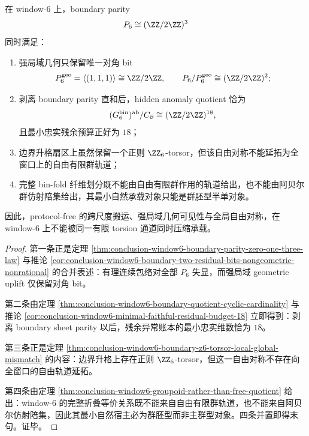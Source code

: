 \begin{theorem}\label{thm:conclusion-window6-boundary-onebit-eighteenquotient-groupoid-splitting}
在 window-\(6\) 上，boundary parity
\[
P_6\cong (\ZZ/2\ZZ)^3
\]
同时满足：
\begin{enumerate}
  \item 强局域几何只保留唯一对角 bit
  \[
  P_6^{\mathrm{geo}}=\langle(1,1,1)\rangle\cong \ZZ/2\ZZ,
  \qquad
  P_6/P_6^{\mathrm{geo}}\cong (\ZZ/2\ZZ)^2;
  \]
  \item 剥离 boundary parity 直和后，hidden anomaly quotient 恰为
  \[
  (G_6^{\mathrm{bin}})^{\mathrm{ab}}/C_{\partial}\cong (\ZZ/2\ZZ)^{18},
  \]
  且最小忠实残余预算正好为 \(18\)；
  \item 边界升格扇区上虽然保留一个正则 \(\ZZ_6\)-torsor，但该自由对称不能延拓为全窗口上的自由有限群轨道；
  \item 完整 bin-fold 纤维划分既不能由自由有限群作用的轨道给出，也不能由阿贝尔群仿射陪集给出，其最小自然承载对象只能是群胚型半单对象。
\end{enumerate}
因此，protocol-free 的跨尺度搬运、强局域几何可见性与全局自由对称，在 window-\(6\) 上不能被同一有限 torsion 通道同时压缩承载。
\end{theorem}
\begin{proof}
第一条正是定理 \ref{thm:conclusion-window6-boundary-parity-zero-one-three-law} 与推论 \ref{cor:conclusion-window6-boundary-two-residual-bits-nongeometric-nonrational} 的合并表述：有理连续包络对全部 \(P_6\) 失显，而强局域 geometric uplift 仅保留对角 bit。

第二条由定理 \ref{thm:conclusion-window6-boundary-quotient-cyclic-cardinality} 与推论 \ref{cor:conclusion-window6-minimal-faithful-residual-budget-18} 立即得到：剥离 boundary sheet parity 以后，残余异常账本的最小忠实维数恰为 \(18\)。

第三条正是定理 \ref{thm:conclusion-window6-boundary-z6-torsor-local-global-mismatch} 的内容：边界升格上存在正则 \(\ZZ_6\)-torsor，但这一自由对称不存在向全窗口的自由轨道延拓。

第四条由定理 \ref{thm:conclusion-window6-groupoid-rather-than-free-quotient} 给出：window-\(6\) 的完整折叠等价关系既不能来自自由有限群轨道，也不能来自阿贝尔仿射陪集，因此其最小自然宿主必为群胚型而非主群型对象。四条并置即得末句。证毕。
\end{proof}

